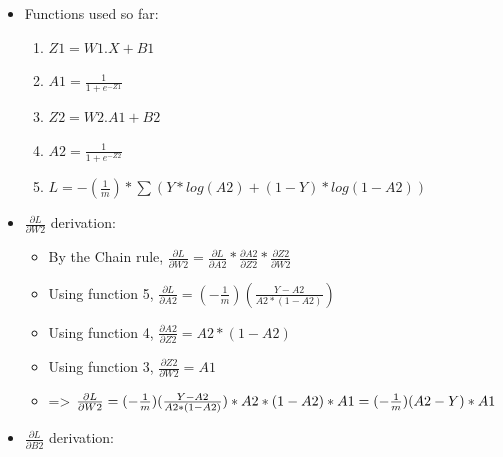 \documentclass[10pt,a4paper]{article}
\begin{document}
\begin{itemize}
    \item Functions used so far:
    \begin{enumerate}
        \item $Z1 = W1 . X + B1$
        \item $A1 = \frac{1}{1+e^{-Z1}}$
        \item $Z2 = W2 . A1 + B2$
        \item $A2 = \frac{1}{1+e^{-Z2}}$
        \item $L = -(\frac{1}{m}) * \sum(Y * log(A2) + (1-Y) * log(1-A2))$
    \end{enumerate}
    \item $\frac{\partial{L}}{\partial{W2}}$ derivation:
    \begin{itemize}
        \item By the Chain rule, $\frac{\partial{L}}{\partial{W2}} = \frac{\partial{L}}{\partial{A2}} * \frac{\partial{A2}}{\partial{Z2}} * \frac{\partial{Z2}}{\partial{W2}}$
        \item Using function 5, $\frac{\partial{L}}{\partial{A2}} = (-\frac{1}{m})(\frac{Y-A2}{A2 * (1-A2)})$
        \item Using function 4, $\frac{\partial{A2}}{\partial{Z2}} = A2 * (1-A2)$
        \item Using function 3, $\frac{\partial{Z2}}{\partial{W2}} = A1$
        \item => $\frac{\partial{L}}{\partial{W2}} = (-\frac{1}{m})(\frac{Y-A2}{A2 * (1-A2)}) * A2 * (1-A2) * A1\\
              = (-\frac{1}{m})(A2-Y) * A1$
    \end{itemize}
    \item $\frac{\partial{L}}{\partial{B2}}$ derivation:
\end{itemize}
\end{document}
